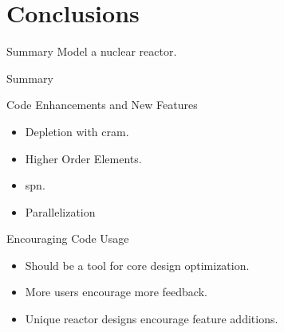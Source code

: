 \section{Conclusions}
\label{sec:conclusions}

\begin{frame}{Summary}
  \huge Model a nuclear reactor.
\end{frame}

\begin{frame}{Summary}
  
\end{frame}

\begin{frame}{Code Enhancements and New Features}
  \begin{itemize}
    \item Depletion with \gls{cram}.
    \item Higher Order Elements.
    \item \gls{spn}.
    \item Parallelization
  \end{itemize}
\end{frame}

\begin{frame}{Encouraging Code Usage}
  \begin{itemize}
    \item Should be a tool for core design optimization.
    \item More users encourage more feedback.
    \item Unique reactor designs encourage feature additions.
  \end{itemize}
\end{frame}
